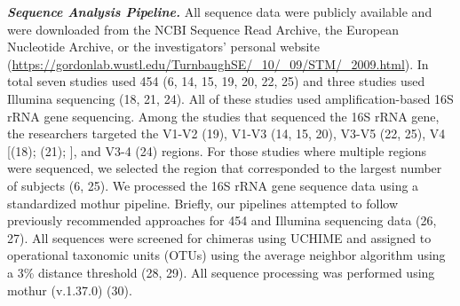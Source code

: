 \documentclass[12pt,]{article}
\begin{document}
\textbf{\emph{Sequence Analysis Pipeline.}} All sequence data were
publicly available and were downloaded from the NCBI Sequence Read
Archive, the European Nucleotide Archive, or the investigators' personal
website
(\url{https://gordonlab.wustl.edu/TurnbaughSE/_10/_09/STM/_2009.html}).
In total seven studies used 454 (6, 14, 15, 19, 20, 22, 25) and three
studies used Illumina sequencing (18, 21, 24). All of these studies used
amplification-based 16S rRNA gene sequencing. Among the studies that
sequenced the 16S rRNA gene, the researchers targeted the V1-V2 (19),
V1-V3 (14, 15, 20), V3-V5 (22, 25), V4 {[}(18); (21); {]}, and V3-4 (24)
regions. For those studies where multiple regions were sequenced, we
selected the region that corresponded to the largest number of subjects
(6, 25). We processed the 16S rRNA gene sequence data using a
standardized mothur pipeline. Briefly, our pipelines attempted to follow
previously recommended approaches for 454 and Illumina sequencing data
(26, 27). All sequences were screened for chimeras using UCHIME and
assigned to operational taxonomic units (OTUs) using the average
neighbor algorithm using a 3\% distance threshold (28, 29). All sequence
processing was performed using mothur (v.1.37.0) (30).
\end{document}
